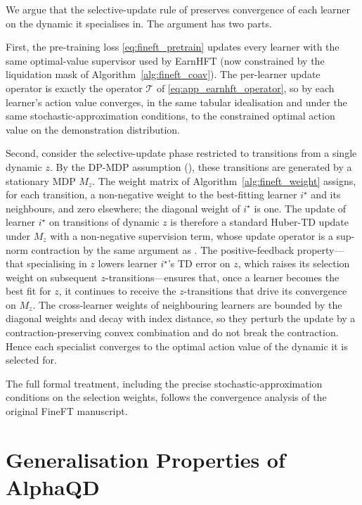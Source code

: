 We argue that the selective-update rule of  preserves convergence of each learner on the dynamic it specialises in. The argument has two parts.

First, the pre-training loss \eqref{eq:fineft_pretrain} updates every learner with the same optimal-value supervisor used by EarnHFT (now constrained by the liquidation mask of Algorithm~\ref{alg:fineft_coav}). The per-learner update operator is exactly the operator $\mathcal{T}$ of \eqref{eq:app_earnhft_operator}, so by  each learner's action value converges, in the same tabular idealisation and under the same stochastic-approximation conditions, to the constrained optimal action value on the demonstration distribution.

Second, consider the selective-update phase restricted to transitions from a single dynamic $z$. By the DP-MDP assumption (), these transitions are generated by a stationary MDP $M_z$. The weight matrix of Algorithm~\ref{alg:fineft_weight} assigns, for each transition, a non-negative weight to the best-fitting learner $i^\star$ and its neighbours, and zero elsewhere; the diagonal weight of $i^\star$ is one. The update of learner $i^\star$ on transitions of dynamic $z$ is therefore a standard Huber-TD update under $M_z$ with a non-negative supervision term, whose update operator is a sup-norm contraction by the same argument as . The positive-feedback property---that specialising in $z$ lowers learner $i^\star$'s TD error on $z$, which raises its selection weight on subsequent $z$-transitions---ensures that, once a learner becomes the best fit for $z$, it continues to receive the $z$-transitions that drive its convergence on $M_z$. The cross-learner weights of neighbouring learners are bounded by the diagonal weights and decay with index distance, so they perturb the update by a contraction-preserving convex combination and do not break the contraction. Hence each specialist converges to the optimal action value of the dynamic it is selected for.

The full formal treatment, including the precise stochastic-approximation conditions on the selection weights, follows the convergence analysis of the original FineFT manuscript.

\section{Generalisation Properties of AlphaQD}
\label{app:alphaqd_theory}

